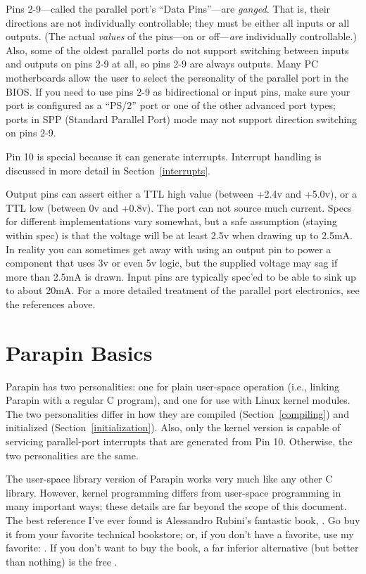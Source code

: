 \documentclass{article}
\begin{document}
Pins 2-9---called the parallel port's ``Data Pins''---are {\em
ganged}.  That is, their directions are not individually controllable;
they must be either all inputs or all outputs.  (The actual {\em
values} of the pins---on or off---{\em are} individually
controllable.)  Also, some of the oldest parallel ports do not support
switching between inputs and outputs on pins 2-9 at all, so pins 2-9
are always outputs.  Many PC motherboards allow the user to select the
personality of the parallel port in the BIOS.  If you need to use pins
2-9 as bidirectional or input pins, make sure your port is configured
as a ``PS/2'' port or one of the other advanced port types; ports in
SPP (Standard Parallel Port) mode may not support direction switching
on pins 2-9.

Pin 10 is special because it can generate interrupts.  Interrupt
handling is discussed in more detail in Section~\ref{interrupts}.

Output pins can assert either a TTL high value (between +2.4v and
+5.0v), or a TTL low (between 0v and +0.8v).  The port can not source
much current.  Specs for different implementations vary somewhat, but
a safe assumption (staying within spec) is that the voltage will be at
least 2.5v when drawing up to 2.5mA.  In reality you can sometimes get
away with using an output pin to power a component that uses 3v or
even 5v logic, but the supplied voltage may sag if more than 2.5mA is
drawn.  Input pins are typically spec'ed to be able to sink up to
about 20mA.  For a more detailed treatment of the parallel port
electronics, see the references above.

\section{Parapin Basics}
\label{basics}

Parapin has two personalities: one for plain user-space operation
(i.e., linking Parapin with a regular C program), and one for use with
Linux kernel modules.  The two personalities differ in how they are
compiled (Section~\ref{compiling}) and initialized
(Section~\ref{initialization}).  Also, only the kernel version is
capable of servicing parallel-port interrupts that are generated from
Pin 10.  Otherwise, the two personalities are the same.

The user-space library version of Parapin works very much like any
other C library.  However, kernel programming differs from user-space
programming in many important ways; these details are far beyond the
scope of this document.  The best reference I've ever found is
Alessandro Rubini's fantastic book, .  Go buy it
from your favorite technical bookstore; or, if you don't have a
favorite, use my favorite:
.  If you
don't want to buy the book, a far inferior alternative (but better
than nothing) is the free .
\end{document}
